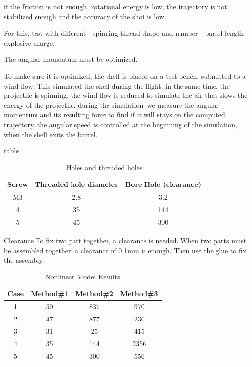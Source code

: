 \documentclass[12pt,a4paper]{article}
\begin{document}
if the friction is not enough, rotational energy is low, the trajectory is not stabilized enough and the accuracy of the shot is low. 

For this, test with different 
- spinning thread shape and number
- barrel length
- explosive charge. 

The angular momentum must be optimized.

To make sure it is optimized, the shell is placed on a test bench, submitted to a wind flow. This simulated the shell during the flight. in the same time, the projectile is spinning. 
the wind flow is reduced to simulate the air that slows the energy of the projectile. during the simulation, we measure the angular momentum and its resulting force to find if it will stays on the computed trajectory. 
the angular speed is controlled at the beginning of the simulation, when the shell exits the barrel. 

\newpage

table

\begin{table}[ht]
	\caption{Holes and threaded holes} %
	\centering %
	\begin{tabular}{c c c} %
		\hline\hline %
		Screw & Threaded hole diameter & Bore Hole (clearance) \\ [0.5ex] %
		\hline %
		M3 & 2.8 & 3.2 \\ %
		4 & 35 & 144 \\
		5 & 45 & 300 \\ [1ex] %
		\hline %
	\end{tabular}\label{table:nonlin} %
\end{table}

Clearance
To fix two part together, a clearance is needed.
When two parts must be assembled together, a clearance of 0.1mm is enough. Then use the glue to fix the assembly. 



\begin{table}[ht]
	\caption{Nonlinear Model Results} %
	\centering %
	\begin{tabular}{c c c c} %
		\hline\hline %
		Case & Method\#1 & Method\#2 & Method\#3 \\ [0.5ex] %
		\hline %
		1 & 50 & 837 & 970 \\ %
		2 & 47 & 877 & 230 \\
		3 & 31 & 25 & 415 \\
		4 & 35 & 144 & 2356 \\
		5 & 45 & 300 & 556 \\ [1ex] %
		\hline %
	\end{tabular}\label{table:nonlin} %
\end{table}
\end{document}
